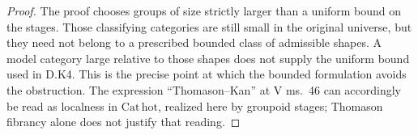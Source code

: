 \begin{proof}
The proof chooses groups of size strictly larger than a
uniform bound on the stages. Those classifying categories
are still small in the original universe, but they need
not belong to a prescribed bounded class of admissible
shapes. A model category large relative to those shapes
does not supply the uniform bound used in D.K4. This is
the precise point at which the bounded formulation avoids
the obstruction. The expression ``Thomason--Kan'' at
V ms.~46 can accordingly be read as localness in
$\mathrm{Cat\,hot}$, realized here by groupoid stages;
Thomason fibrancy alone does not justify that reading.
\end{proof}
